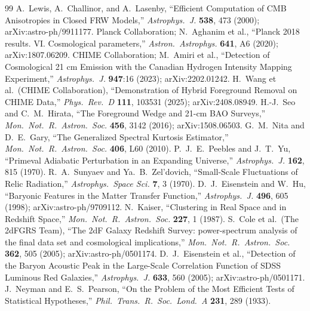 \begin{thebibliography}{99}
 A.~Lewis, A.~Challinor, and A.~Lasenby, ``Efficient Computation of CMB Anisotropies in Closed FRW Models,'' \emph{Astrophys.\ J.} \textbf{538}, 473 (2000); arXiv:astro-ph/9911177.
 Planck Collaboration; N.~Aghanim et al., ``Planck 2018 results. VI. Cosmological parameters,'' \emph{Astron.\ Astrophys.} \textbf{641}, A6 (2020); arXiv:1807.06209.
 CHIME Collaboration; M.~Amiri et al., ``Detection of Cosmological 21 cm Emission with the Canadian Hydrogen Intensity Mapping Experiment,'' \emph{Astrophys.\ J.} \textbf{947}:16 (2023); arXiv:2202.01242.
 H.~Wang et al.\ (CHIME Collaboration), ``Demonstration of Hybrid Foreground Removal on CHIME Data,'' \emph{Phys.\ Rev.\ D} \textbf{111}, 103531 (2025); arXiv:2408.08949.
 H.-J.~Seo and C.~M.~Hirata, ``The Foreground Wedge and 21-cm BAO Surveys,'' \emph{Mon.\ Not.\ R.\ Astron.\ Soc.} \textbf{456}, 3142 (2016); arXiv:1508.06503.
 G.~M.~Nita and D.~E.~Gary, ``The Generalized Spectral Kurtosis Estimator,'' \emph{Mon.\ Not.\ R.\ Astron.\ Soc.} \textbf{406}, L60 (2010).
 P.~J.~E.~Peebles and J.~T.~Yu, ``Primeval Adiabatic Perturbation in an Expanding Universe,'' \emph{Astrophys.\ J.} \textbf{162}, 815 (1970).
 R.~A.~Sunyaev and Ya.~B.~Zel'dovich, ``Small-Scale Fluctuations of Relic Radiation,'' \emph{Astrophys.\ Space Sci.} \textbf{7}, 3 (1970).
 D.~J.~Eisenstein and W.~Hu, ``Baryonic Features in the Matter Transfer Function,'' \emph{Astrophys.\ J.} \textbf{496}, 605 (1998); arXiv:astro-ph/9709112.
 N.~Kaiser, ``Clustering in Real Space and in Redshift Space,'' \emph{Mon.\ Not.\ R.\ Astron.\ Soc.} \textbf{227}, 1 (1987).
 S.~Cole et al.\ (The 2dFGRS Team), ``The 2dF Galaxy Redshift Survey: power-spectrum analysis of the final data set and cosmological implications,'' \emph{Mon.\ Not.\ R.\ Astron.\ Soc.} \textbf{362}, 505 (2005); arXiv:astro-ph/0501174.
 D.~J.~Eisenstein et al., ``Detection of the Baryon Acoustic Peak in the Large-Scale Correlation Function of SDSS Luminous Red Galaxies,'' \emph{Astrophys.\ J.} \textbf{633}, 560 (2005); arXiv:astro-ph/0501171.
 J.~Neyman and E.~S.~Pearson, ``On the Problem of the Most Efficient Tests of Statistical Hypotheses,'' \emph{Phil.\ Trans.\ R.\ Soc.\ Lond.\ A} \textbf{231}, 289 (1933).

\end{thebibliography}
